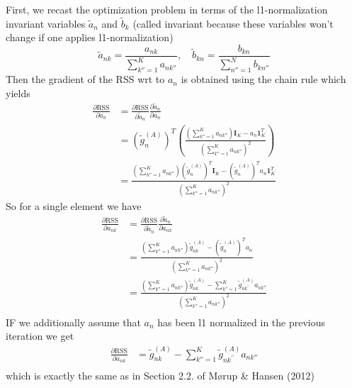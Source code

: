 \documentclass[oneside]{article}
\begin{document}
First, we recast the optimization problem in terms of the l1-normalization invariant variables $\tilde{a}_n$ and $\tilde{b}_k$ (called invariant because these variables won't change if one applies l1-normalization)
\begin{equation}
\tilde{a}_{nk} = \frac{a_{nk}}{\sum_{k''=1}^K a_{nk''}}, \quad \tilde{b}_{kn} = \frac{b_{kn}}{\sum_{n''=1}^N b_{kn''}}
\end{equation}
Then the gradient of the RSS wrt to $a_{n}$ is obtained using the chain rule which yields
\begin{equation}
\begin{aligned}
\frac{\partial \text{RSS}}{\partial a_n} &= \frac{\partial \text{RSS}}{\partial \tilde{a}_n} \frac{\partial  \tilde{a}_n}{\partial a_n} \\
&= \left( \tilde{g}^{(A)}_n \right)^T \left( \frac{\left( \sum_{k''=1}^K a_{nk''} \right) \mathbf{I}_K - a_n \mathbf{1}_K^T}{\left( \sum_{k''=1}^K a_{nk''} \right)^2} \right) \\
&= \frac{\left( \sum_{k''=1}^K a_{nk''} \right) \left( \tilde{g}^{(A)}_n \right)^T \mathbf{I}_K - \left( \tilde{g}^{(A)}_n \right)^T a_n \mathbf{1}_K^T}{\left( \sum_{k''=1}^K a_{nk''} \right)^2}
\end{aligned}
\end{equation}
So for a single element we have
\begin{equation}
\begin{aligned}
\frac{\partial \text{RSS}}{\partial a_{nk}} &= \frac{\partial \text{RSS}}{\partial \tilde{a}_n} \frac{\partial  \tilde{a}_n}{\partial a_{nk}} \\
&= \frac{\left( \sum_{k''=1}^K a_{nk''} \right) \tilde{g}^{(A)}_{nk} - \left( \tilde{g}^{(A)}_n \right)^T a_n}{\left( \sum_{k''=1}^K a_{nk''} \right)^2} \\
&= \frac{\left( \sum_{k''=1}^K a_{nk''} \right) \tilde{g}^{(A)}_{nk} - \sum_{k''=1}^K  \tilde{g}^{(A)}_{n k^{\prime \prime}} a_{nk''} }{\left( \sum_{k''=1}^K a_{nk''} \right)^2} \\
\end{aligned}
\end{equation}
IF we additionally assume that $a_n$ has been l1 normalized in the previous iteration we get 
\begin{equation}
\begin{aligned}
\frac{\partial \text{RSS}}{\partial a_{nk}} 
&= \tilde{g}^{(A)}_{nk} - \sum_{k''=1}^K  \tilde{g}^{(A)}_{n k^{\prime \prime}} a_{nk''} \\
\end{aligned}
\end{equation}
which is exactly the same as in Section 2.2. of Mørup \& Hansen (2012) \autocite{morupArchetypalAnalysisMachine2012}
\end{document}
